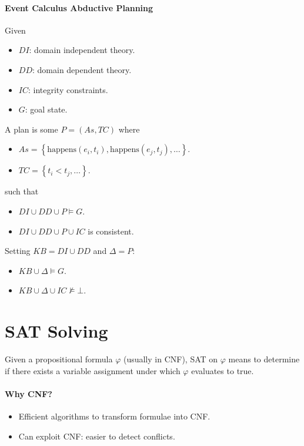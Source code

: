 \documentclass[twocolumn,english]{article}
\begin{document}
\paragraph{Event Calculus Abductive Planning}

Given
\begin{itemize}
\item $DI$: domain independent theory.
\item $DD$: domain dependent theory.
\item $IC$: integrity constraints.
\item $G$: goal state.
\end{itemize}
A plan is some $P=\left(As,TC\right)$ where
\begin{itemize}
\item $As=\left\{ \text{happens}\left(e_{i},t_{i}\right),\text{happens}\left(e_{j},t_{j}\right),\dots\right\} $.
\item $TC=\left\{ t_{i}<t_{j},\dots\right\} $.
\end{itemize}
such that
\begin{itemize}
\item $DI\cup DD\cup P\vDash G$.
\item $DI\cup DD\cup P\cup IC$ is consistent.
\end{itemize}
Setting $KB=DI\cup DD$ and $\Delta=P$:
\begin{itemize}
\item $KB\cup\Delta\vDash G$.
\item $KB\cup\Delta\cup IC\not\vDash\bot$.
\end{itemize}

\section{SAT Solving}

Given a propositional formula $\varphi$ (usually in CNF), SAT on
$\varphi$ means to determine if there exists a variable assignment
under which $\varphi$ evaluates to true.

\paragraph{Why CNF?}
\begin{itemize}
\item Efficient algorithms to transform formulae into CNF.
\item Can exploit CNF: easier to detect conflicts.
\end{itemize}
\end{document}
